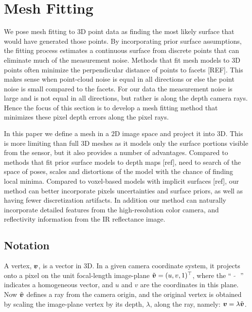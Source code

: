\section{Mesh Fitting}
\label{sec:fitting}

We pose mesh fitting to 3D point data as finding the most likely surface that would have generated those points.  By incorporating prior surface assumptions, the fitting process estimates a continuous surface from discrete points that can eliminate much of the measurement noise.  Methods that fit mesh models to 3D points often minimize the perpendicular distance of points to facets [REF].  This makes sense when point-cloud noise is equal in all directions or else the point noise is small compared to the facets.  For our data the measurement noise is large and is not equal in all directions, but rather is along the depth camera rays.  Hence the focus of this section is to develop a mesh fitting method that minimizes these pixel depth errors along the pixel rays.

In this paper we define a mesh in a $2$D image space and project it into $3$D.  This is more limiting than full $3$D meshes as it models only the surface portions visible from the sensor, but it also provides a number of advantages.  Compared to methods that fit prior surface models to depth maps [ref], need to search of the space of poses, scales and distortions of the model with the chance of finding local minima.  Compared to voxel-based models with implicit surfaces [ref], our method can better incorporate pixels uncertainties and surface priors, as well as having fewer discretization artifacts.  In addition our method can naturally incorporate detailed features from the high-resolution color camera, and reflectivity information from the IR reflectance image.

\subsection{Notation}

A vertex, $\boldsymbol{v}$, is a vector in $3$D.  In a given camera coordinate system, it projects onto a pixel on the unit focal-length image-plane $\tilde{\boldsymbol{v}}=(u,v,1)^\top$, where the `` $\tilde{\text{ }}$ '' indicates a homogeneous vector, and $u$ and $v$ are the coordinates in this plane.  Now $\tilde{\boldsymbol{v}}$ defines a ray from the camera origin, and the original vertex is obtained by scaling the image-plane vertex by its depth, $\lambda$, along the ray, namely: $\boldsymbol{v} = \lambda\tilde{\boldsymbol{v}}$. 

